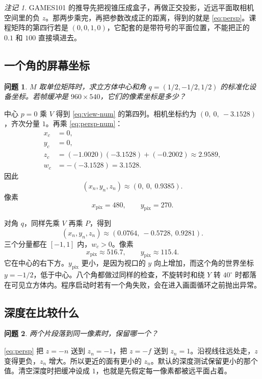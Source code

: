 \documentclass[12pt,a4paper]{article}
\theoremstyle{definition}
\theoremstyle{plain}
\newtheorem{problem}{问题}[section]
\theoremstyle{remark}
\newtheorem*{remark}{注记}
\begin{document}
\begin{remark}
GAMES101 的推导先把视锥压成盒子，再做正交投影，近远平面取相机空间里的负 $z$。那两步乘完，再把参数改成正的距离，得到的就是 \eqref{eq:persp}。课程矩阵的第四行若是 $(0,0,1,0)$，它配套的是带符号的平面位置，不能把正的 $0.1$ 和 $100$ 直接填进去。
\end{remark}

\subsection{一个角的屏幕坐标}

\begin{problem}
$M$ 取单位矩阵时，求立方体中心和角 $q=(1/2,-1/2,1/2)$ 的标准化设备坐标。若帧缓冲是 $960\times 540$，它们的像素坐标是多少？
\end{problem}

中心 $p=0$ 乘 $V$ 得到 \eqref{eq:view-num} 的第四列。相机坐标约为 $(0,\ 0,\ -3.1528)$，齐次分量 $1$。再乘 \eqref{eq:persp-num}：
\begin{align*}
x_c&=0,\\
y_c&=0,\\
z_c&=(-1.0020)(-3.1528)+(-0.2002)\approx 2.9589,\\
w_c&=-(-3.1528)=3.1528.
\end{align*}
因此
\[
(x_n,y_n,z_n)\approx(0,\ 0,\ 0.9385).
\]
像素
\[
x_{\mathrm{pix}}=480,\qquad y_{\mathrm{pix}}=270.
\]

对角 $q$，同样先乘 $V$ 再乘 $P$，得到
\[
(x_n,y_n,z_n)\approx(0.0764,\ -0.5728,\ 0.9281).
\]
三个分量都在 $[-1,1]$ 内，$w_c>0$。像素
\[
x_{\mathrm{pix}}\approx 516.7,\qquad y_{\mathrm{pix}}\approx 115.4.
\]
它在中心的右下方。$y_{\mathrm{pix}}$ 更小，是因为视口的 $y$ 向上增加，而这个角的世界坐标 $y=-1/2$，低于中心。八个角都做过同样的检查，不旋转时和绕 $Y$ 转 $40^\circ$ 时都落在可见立方体内。程序启动时若有一个角失败，会在进入画面循环之前抛出异常。

\subsection{深度在比较什么}

\begin{problem}
两个片段落到同一像素时，保留哪一个？
\end{problem}

\eqref{eq:persp} 把 $z=-n$ 送到 $z_n=-1$，把 $z=-f$ 送到 $z_n=1$。沿视线往远处走，$z$ 变得更负，$z_n$ 增大。所以更近的面有更小的 $z_n$。默认的深度测试保留更小的那个值。清空深度时把缓冲设成 $1$，也就是先假定每一像素都被远平面占着。
\end{document}

